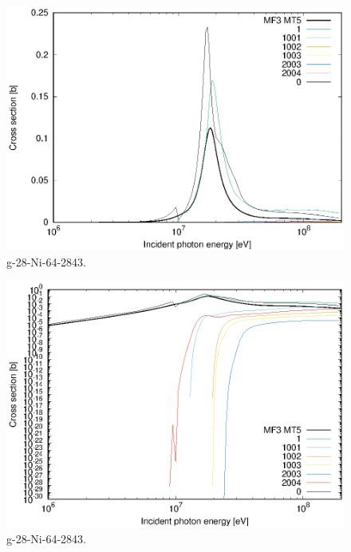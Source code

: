 \begin{figure}
 \includegraphics[width=\linewidth]{eps/g_28-Ni-64_2843.eps}
  \caption{g-28-Ni-64-2843.}
\end{figure}
\begin{figure}
 \includegraphics[width=\linewidth]{eps-log/g_28-Ni-64_2843.eps}
 \caption{g-28-Ni-64-2843.}
\end{figure}
\newpage \clearpage

